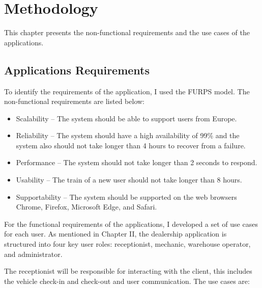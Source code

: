 \chapter{Methodology}%
\label{chapter:methodology}

\begin{introduction}
This chapter presents the non-functional requirements and the use cases of the applications. 
\end{introduction} 




\section{Applications Requirements} 


To identify the requirements of the application, I used the FURPS model. 
The non-functional requirements are listed below:

\begin{itemize}
  \item Scalability – The system should be able to support users from Europe.
  \item Reliability – The system should have a high availability of 99\% and the system also should not take longer than 4 hours to recover from a failure.
  \item Performance – The system should not take longer than 2 seconds to respond.
  \item Usability – The train of a new user should not take longer than 8 hours.
  \item Supportability – The system should be supported on the web browsers Chrome, Firefox, Microsoft Edge, and Safari.
\end{itemize}

For the functional requirements of the applications, I developed a set of use cases for each user.
As mentioned in Chapter II, the dealership application is structured into four key user roles: receptionist, mechanic, warehouse operator, and administrator.

The receptionist will be responsible for interacting with the client, this includes the vehicle check-in and check-out and user communication. 
The use cases are:

